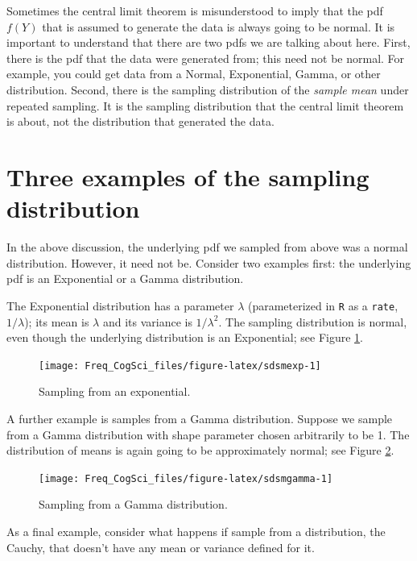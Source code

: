 \documentclass[12pt,]{krantz}
\begin{document}
Sometimes the central limit theorem is misunderstood to imply that the pdf \(f(Y)\) that is assumed to generate the data is always going to be normal. It is important to understand that there are two pdfs we are talking about here. First, there is the pdf that the data were generated from; this need not be normal. For example, you could get data from a Normal, Exponential, Gamma, or other distribution. Second, there is the sampling distribution of the \emph{sample mean} under repeated sampling. It is the sampling distribution that the central limit theorem is about, not the distribution that generated the data.

\hypertarget{three-examples-of-the-sampling-distribution}{%
\section{Three examples of the sampling distribution}\label{three-examples-of-the-sampling-distribution}}

In the above discussion, the underlying pdf we sampled from above was a normal distribution. However, it need not be. Consider two examples first: the underlying pdf is an Exponential or a Gamma distribution.

The Exponential distribution has a parameter \(\lambda\) (parameterized in \texttt{R} as a \texttt{rate}, \(1/\lambda\)); its mean is \(\lambda\) and its variance is \(1/\lambda^2\). The sampling distribution is normal, even though the underlying distribution is an Exponential; see Figure \ref{fig:sdsmexp}.

\begin{figure}
\texttt{[image: Freq\_CogSci\_files/figure-latex/sdsmexp-1]} \caption{Sampling from an exponential.}\label{fig:sdsmexp}
\end{figure}

A further example is samples from a Gamma distribution. Suppose we sample from a Gamma distribution with shape parameter chosen arbitrarily to be 1. The distribution of means is again going to be approximately normal; see Figure \ref{fig:sdsmgamma}.

\begin{figure}
\texttt{[image: Freq\_CogSci\_files/figure-latex/sdsmgamma-1]} \caption{Sampling from a Gamma distribution.}\label{fig:sdsmgamma}
\end{figure}

As a final example, consider what happens if sample from a distribution, the Cauchy, that doesn't have any mean or variance defined for it.
\end{document}
